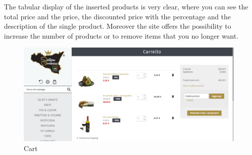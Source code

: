 The tabular display of the inserted products is very clear, where you can see the total price and the price, the discounted price with the percentage and the description of the single product. Moreover the site offers the possibility to increase the number of products or to remove items that you no longer want.

\begin{figure}[H]
	\centering\includegraphics[width=12cm]{Img/cart.png}
	\caption{Cart}
\end{figure}

\pagebreak